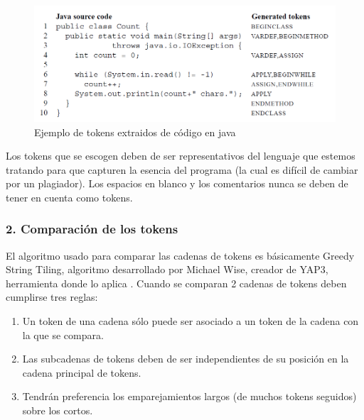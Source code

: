 \begin{figure}[H] %
\centering
\includegraphics[scale=0.5]{imagenes/JPLAG_ejemplo_tokens.png}  %
\caption{Ejemplo de tokens extraidos de código en java } \label{fig:ej_JPLAG1}
\end{figure}


Los tokens que se escogen deben de ser representativos del lenguaje que estemos tratando para que capturen la esencia del programa (la cual es difícil de cambiar por un plagiador).
\newline
Los espacios en blanco y los comentarios nunca se deben de tener en cuenta como tokens.


\subsubsection{2. Comparación de los tokens}
El algoritmo usado para comparar las cadenas de tokens es básicamente Greedy String Tiling, algoritmo desarrollado por Michael Wise, creador de YAP3, herramienta donde lo aplica \cite{yap3}.
\newline
Cuando se comparan 2 cadenas de tokens deben cumplirse tres reglas:
\begin{enumerate}
\item Un token de una cadena sólo puede ser asociado a un token de la cadena con la que se compara.
\item Las subcadenas de tokens deben de ser independientes de su posición en la cadena principal de tokens. 
\item Tendrán preferencia los emparejamientos largos (de muchos tokens seguidos) sobre los cortos.
\newline
\end{enumerate}

